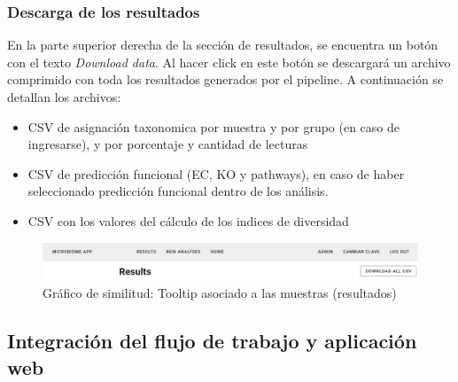 \subsubsection{Descarga de los resultados}
En la parte superior derecha de la sección de resultados, se encuentra un botón con el texto \textit{Download data}. 
Al hacer click en este botón se descargará un archivo comprimido con toda los resultados generados por el pipeline.
A continuación se detallan los archivos:
\begin{itemize}
    \item CSV de asignación taxonomica por muestra y por grupo (en caso de ingresarse), y por porcentaje y cantidad de lecturas
    \item CSV de predicción funcional (EC, KO y pathways), en caso de haber seleccionado predicción funcional dentro de los análisis.
    \item CSV con los valores del cálculo de los indices de diversidad
\end{itemize}


\begin{figure}[H]
    \includegraphics[width=1\linewidth]{images/app/donwload_button.png}

    \caption{Gráfico de similitud: Tooltip asociado a las muestras (resultados)}
    \label{fig:app-download-button}
\end{figure}



\subsection{Integración del flujo de trabajo y aplicación web}

